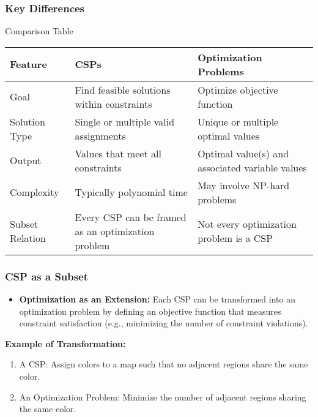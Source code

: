 \documentclass[aspectratio=169]{beamer}
\begin{document}
\begin{frame}[fragile]
    \frametitle{Key Differences}
    
    \begin{block}{Comparison Table}
        \begin{center}
            \begin{tabular}{|l|l|l|}
                \hline
                \textbf{Feature} & \textbf{CSPs} & \textbf{Optimization Problems} \\
                \hline
                Goal & Find feasible solutions within constraints & Optimize objective function \\
                \hline
                Solution Type & Single or multiple valid assignments & Unique or multiple optimal values \\
                \hline
                Output & Values that meet all constraints & Optimal value(s) and associated variable values \\
                \hline
                Complexity & Typically polynomial time & May involve NP-hard problems \\
                \hline
                Subset Relation & Every CSP can be framed as an optimization problem & Not every optimization problem is a CSP \\
                \hline
            \end{tabular}
        \end{center}
    \end{block}
\end{frame}

\begin{frame}[fragile]
    \frametitle{CSP as a Subset}
    
    \begin{itemize}
        \item \textbf{Optimization as an Extension:} 
        Each CSP can be transformed into an optimization problem by defining an objective function that measures constraint satisfaction (e.g., minimizing the number of constraint violations).
    \end{itemize}
    
    \textbf{Example of Transformation:}
    \begin{enumerate}
        \item A CSP: Assign colors to a map such that no adjacent regions share the same color.
        \item An Optimization Problem: Minimize the number of adjacent regions sharing the same color.
    \end{enumerate}
\end{frame}
\end{document}
